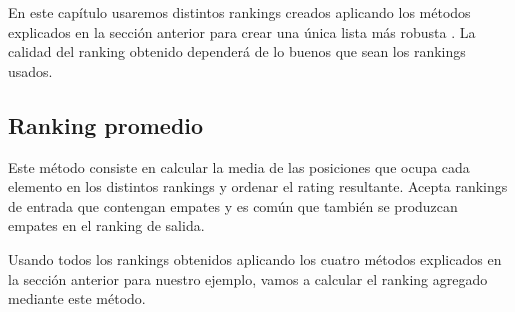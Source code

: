 En este capítulo usaremos distintos rankings creados aplicando los métodos explicados en la sección anterior para crear una única lista más robusta \cite[Chapters 14 \& 15]{libro_rankings}. La calidad del ranking obtenido dependerá de lo buenos que sean los rankings usados. 

\subsection{Ranking promedio}

Este método consiste en calcular la media de las posiciones que ocupa cada elemento en los distintos rankings y ordenar el rating resultante. Acepta rankings de entrada que contengan empates y es común que también se produzcan empates en el ranking de salida.\\

\newpage

\begin{ejem} Usando todos los rankings obtenidos aplicando los cuatro métodos explicados en la sección anterior para nuestro ejemplo, vamos a calcular el ranking agregado mediante este método.
\end{ejem}
	

